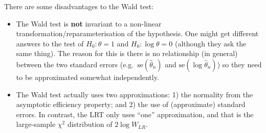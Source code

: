 \documentclass[
]{book}
\theoremstyle{definition}
\theoremstyle{definition}
\theoremstyle{definition}
\theoremstyle{definition}
\theoremstyle{remark}
\begin{document}
There are some disadvantages to the Wald test:

\begin{itemize}
\item
  The Wald test is \textbf{not} invariant to a non-linear transformation/reparameterisation of the hypothesis. One might get different answers to the test of \(H_0:\theta=1\) and \(H_0:\log\theta=0\) (although they ask the same thing). The reason for this is there is no relationship (in general) between the two standard errors (e.g.~\(\text{se}(\hat\theta_n)\) and \(\text{se}(\log \hat\theta_n)\)) so they need to be approximated somewhat independently.
\item
  The Wald test actually uses two approximations: 1) the normality from the asymptotic efficiency property; and 2) the use of (approximate) standard errors. In contrast, the LRT only uses ``one'' approximation, and that is the large-sample \(\chi^2\) distribution of \(2\log W_{LR}\).
\end{itemize}
\end{document}
